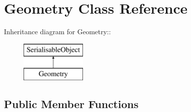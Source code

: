 \hypertarget{classGeometry}{
\section{Geometry Class Reference}
\label{classGeometry}
}
Inheritance diagram for Geometry::\begin{figure}[H]
\begin{center}
\leavevmode
\includegraphics[height=2cm]{classGeometry}
\end{center}
\end{figure}
\subsection*{Public Member Functions}
